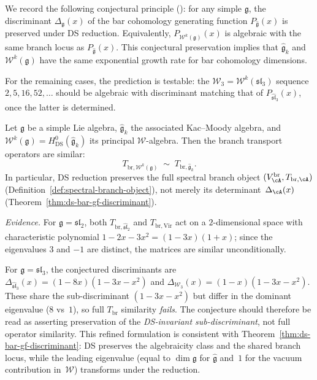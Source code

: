 \begin{remark}\label{rem:ds-discriminant-invariant}
We record the following conjectural principle
(\ClaimStatusConjectured): for any simple $\mathfrak{g}$, the
discriminant $\Delta_{\mathfrak{g}}(x)$ of the bar cohomology
generating function $P_{\widehat{\mathfrak{g}}}(x)$ is preserved under
DS reduction.  Equivalently, $P_{\mathcal{W}^k(\mathfrak{g})}(x)$ is
algebraic with the same branch locus as
$P_{\widehat{\mathfrak{g}}}(x)$.  This conjectural preservation implies
that $\widehat{\mathfrak{g}}_k$ and $\mathcal{W}^k(\mathfrak{g})$
have the same exponential
growth rate for bar cohomology dimensions.

For the remaining cases, the prediction is testable:
the $\mathcal{W}_3 = \mathcal{W}^k(\mathfrak{sl}_3)$ sequence
$2, 5, 16, 52, \ldots$ should be algebraic with discriminant
matching that of $P_{\widehat{\mathfrak{sl}}_3}(x)$, once the latter
is determined.
\end{remark}

\begin{conjecture}\label{conj:ds-spectral-branch-preservation}
Let $\mathfrak{g}$ be a simple Lie algebra,
$\widehat{\mathfrak{g}}_k$ the associated Kac--Moody algebra, and
$\mathcal{W}^k(\mathfrak{g}) = H^0_{\mathrm{DS}}(\widehat{\mathfrak{g}}_k)$
its principal $\mathcal{W}$-algebra.
Then the branch transport operators are similar:
\[
T_{\mathrm{br},\mathcal{W}^k(\mathfrak{g})}
\;\sim\;
T_{\mathrm{br},\widehat{\mathfrak{g}}_k}.
\]
In particular, DS reduction preserves the full spectral branch
object $(V_{\cA}^{\mathrm{br}}, T_{\mathrm{br},\cA})$
\textup{(}Definition~\textup{\ref{def:spectral-branch-object})},
not merely its determinant~$\Delta_{\cA}(x)$
\textup{(}Theorem~\textup{\ref{thm:ds-bar-gf-discriminant})}.

\emph{Evidence.}
For $\mathfrak{g} = \mathfrak{sl}_2$, both
$T_{\mathrm{br},\widehat{\mathfrak{sl}}_2}$ and
$T_{\mathrm{br},\mathrm{Vir}}$ act on a $2$-dimensional
space with characteristic polynomial $1 - 2x - 3x^2
= (1-3x)(1+x)$; since the eigenvalues $3$ and $-1$ are distinct,
the matrices are similar unconditionally.

For $\mathfrak{g} = \mathfrak{sl}_3$,
the conjectured discriminants are
$\Delta_{\widehat{\mathfrak{sl}}_3}(x) = (1-8x)(1-3x-x^2)$
and $\Delta_{\mathcal{W}_3}(x) = (1-x)(1-3x-x^2)$.
These share the sub-discriminant $(1-3x-x^2)$ but differ in
the dominant eigenvalue ($8$ vs~$1$), so full
$T_{\mathrm{br}}$ similarity \emph{fails}.  The conjecture
should therefore be read as asserting preservation of the
\emph{DS-invariant sub-discriminant}, not full operator
similarity.  This refined formulation is consistent with
Theorem~\ref{thm:ds-bar-gf-discriminant}: DS preserves the
algebraicity class and the shared branch locus, while the
leading eigenvalue (equal to $\dim\mathfrak{g}$ for
$\widehat{\mathfrak{g}}$ and~$1$ for the vacuum
contribution in~$\mathcal{W}$) transforms under the
reduction.
\end{conjecture}

